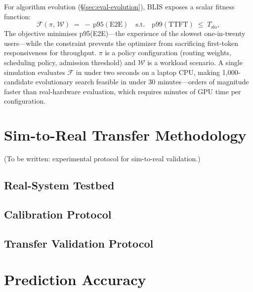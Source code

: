 \documentclass[11pt]{article}
\theoremstyle{plain} %
\theoremstyle{definition} %
\theoremstyle{remark} %
\numberwithin{equation}{section}
\begin{document}
For algorithm evolution (\S\ref{sec:eval-evolution}), BLIS exposes a scalar
fitness function:
\begin{equation}
  \mathcal{F}(\pi,\,\mathcal{W}) \;=\; -\,\mathrm{p95}(\mathrm{E2E})
  \quad\text{s.t.}\quad
  \mathrm{p99}(\mathrm{TTFT}) \;\leq\; T_\mathrm{slo},
  \label{eq:fitness}
\end{equation}
The objective minimises p95(E2E)---the experience of the slowest one-in-twenty
users---while the constraint prevents the optimizer from sacrificing first-token
responsiveness for throughput.
$\pi$ is a policy configuration (routing weights, scheduling policy,
admission threshold) and $\mathcal{W}$ is a workload scenario.
A single simulation evaluates $\mathcal{F}$ in under two seconds on a laptop CPU,
making 1{,}000-candidate evolutionary search feasible in under 30 minutes---orders
of magnitude faster than real-hardware evaluation, which requires minutes of GPU
time per configuration.

\section{Sim-to-Real Transfer Methodology}
\label{sec:simtoreal}

(To be written: experimental protocol for sim-to-real validation.)

\subsection{Real-System Testbed}
\label{subsec:simtoreal-testbed}
\subsection{Calibration Protocol}
\label{subsec:simtoreal-calibration}
\subsection{Transfer Validation Protocol}
\label{subsec:simtoreal-transfer}

\section{Prediction Accuracy}
\label{sec:eval-accuracy}
\end{document}
